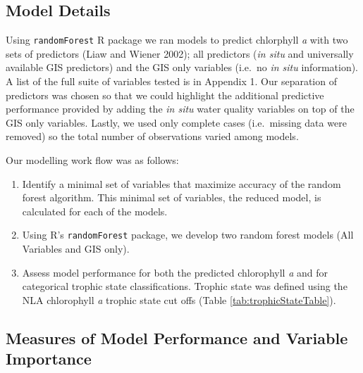 \documentclass[11pt,]{article}
\begin{document}
\subsection{Model Details}\label{model-details}

Using \texttt{randomForest} R package we ran models to predict
chlorphyll \emph{a} with two sets of predictors (Liaw and Wiener 2002);
all predictors (\emph{in situ} and universally available GIS predictors)
and the GIS only variables (i.e.~no \emph{in situ} information). A list
of the full suite of variables tested is in Appendix 1. Our separation
of predictors was chosen so that we could highlight the additional
predictive performance provided by adding the \emph{in situ} water
quality variables on top of the GIS only variables. Lastly, we used only
complete cases (i.e.~missing data were removed) so the total number of
observations varied among models.

Our modelling work flow was as follows:

\begin{enumerate}
\def\labelenumi{\arabic{enumi}.}
\itemsep1pt\parskip0pt
\item
  Identify a minimal set of variables that maximize accuracy of the
  random forest algorithm. This minimal set of variables, the reduced
  model, is calculated for each of the models.
\item
  Using R's \texttt{randomForest} package, we develop two random forest
  models (All Variables and GIS only).
\item
  Assess model performance for both the predicted chlorophyll \emph{a}
  and for categorical trophic state classifications. Trophic state was
  defined using the NLA chlorophyll \emph{a} trophic state cut offs
  (Table \ref{tab:trophicStateTable}).
\end{enumerate}

\subsection{Measures of Model Performance and Variable
Importance}\label{measures-of-model-performance-and-variable-importance}
\end{document}
